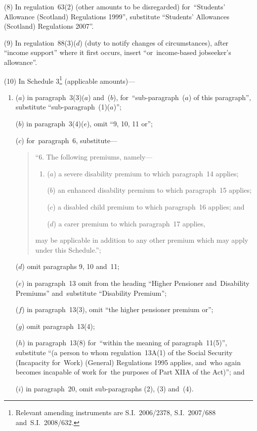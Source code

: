 \documentclass[12pt,a4paper]{article}
\begin{document}
(8) In regulation~63(2) (other amounts to be disregarded) for~“Students’ Allowance (Scotland) Regulations 1999”, substitute “Students’ Allowances (Scotland) Regulations 2007”.

(9) In regulation~88(3)($d$)  (duty to notify changes of circumstances), after “income support” where it first occurs, insert “or~income-based jobseeker’s allowance”.

(10) In Schedule 3\footnote{Relevant amending instruments are S.I.~2006/2378, S.I.~2007/688 and~S.I.~2008/632.} (applicable amounts)—
\begin{enumerate}\item[]
($a$) in paragraph~3(3)($a$)  and~($b$), for~“sub-paragraph~($a$)  of this paragraph”, substitute “sub-paragraph~(1)($a$)”;

($b$) in paragraph~3(4)($e$), omit “9, 10, 11 or”;

($c$) for~paragraph~6, substitute—
\begin{quotation}
“6. The following premiums, namely—
\begin{enumerate}\item[]
($a$) a severe disability premium to which paragraph~14 applies;

($b$) an enhanced disability premium to which paragraph~15 applies;

($c$) a disabled child premium to which paragraph~16 applies; and

($d$) a carer premium to which paragraph~17 applies,
\end{enumerate}
may be applicable in addition to any other premium which may apply under this     Schedule.”;
\end{quotation}

($d$) omit paragraphs 9, 10 and~11;

($e$) in paragraph~13 omit from the heading “Higher Pensioner and~Disability Premiums” and~substitute “Disability Premium”;

($f$) in paragraph~13(3), omit “the higher pensioner premium or”;

($g$) omit paragraph~13(4);

($h$) in paragraph~13(8) for~“within the meaning of paragraph~11(5)”, substitute “(a person to whom regulation~13A(1) of the Social Security (Incapacity for~Work) (General) Regulations 1995 applies, and~who again becomes incapable of work for~the purposes of Part XIIA of the Act)”; and

($i$) in paragraph~20, omit sub-paragraphs (2), (3) and~(4).
\end{enumerate}
\end{document}

